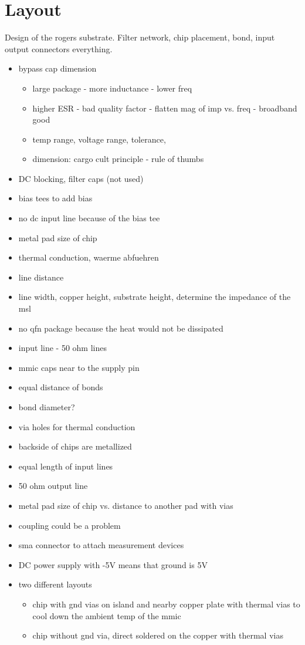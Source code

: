 \chapter{Layout}
Design of the rogers substrate. Filter network, chip placement, bond, input output connectors everything.
\begin{itemize}
	\item bypass cap dimension
	\begin{itemize}
		\item large package - more inductance - lower freq
		\item higher ESR - bad quality factor - flatten mag of imp vs. freq - broadband good
		\item temp range, voltage range, tolerance, 
		\item dimension: cargo cult principle - rule of thumbs
	\end{itemize}
	\item DC blocking, filter caps (not used) 
	\item bias tees to add bias 
	\item no dc input line because of the bias tee
	\item metal pad size of chip
	\item thermal conduction, waerme abfuehren
	\item line distance
	\item line width, copper height, substrate height, determine the impedance of the msl
	\item no qfn package because the heat would not be dissipated
	\item input line - 50 ohm lines
	\item mmic caps near to the supply pin
	\item equal distance of bonds
	\item bond diameter?
	\item via holes for thermal conduction
	\item backside of chips are metallized
	\item equal length of input lines
	\item 50 ohm output line
	\item metal pad size of chip vs. distance to another pad with vias
	\item coupling could be a problem
	\item sma connector to attach measurement devices
	\item DC power supply with -5V means that ground is 5V
	\item two different layouts
	\begin{itemize}
		\item chip with gnd vias on island and nearby copper plate with thermal vias to cool down the ambient temp of the mmic
		\item chip without gnd via, direct soldered on the copper with thermal vias
	\end{itemize}
\end{itemize}